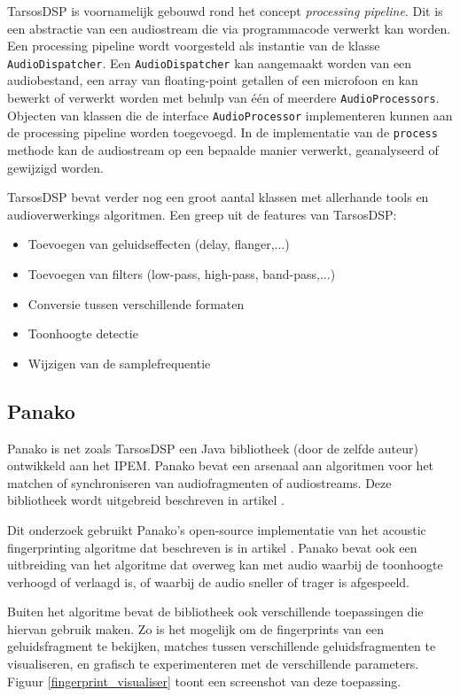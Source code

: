 TarsosDSP is voornamelijk gebouwd rond het concept \textit{processing pipeline}. Dit is een abstractie van een audiostream die via programmacode verwerkt kan worden. Een processing pipeline wordt voorgesteld als instantie van de klasse \texttt{AudioDispatcher}. Een \texttt{AudioDispatcher} kan aangemaakt worden van een audiobestand, een array van floating-point getallen of een microfoon en kan bewerkt of verwerkt worden met behulp van één of meerdere \texttt{AudioProcessors}. Objecten van klassen die de interface \texttt{AudioProcessor} implementeren kunnen aan de processing pipeline worden toegevoegd. In de implementatie van de \texttt{process} methode kan de audiostream op een bepaalde manier verwerkt, geanalyseerd of gewijzigd worden.

TarsosDSP bevat verder nog een groot aantal klassen met allerhande tools en audioverwerkings algoritmen. Een greep uit de features van TarsosDSP:
\begin{itemize}[noitemsep]
	\item Toevoegen van geluidseffecten (delay, flanger,...)
	\item Toevoegen van filters (low-pass, high-pass, band-pass,...)
	\item Conversie tussen verschillende formaten
	\item Toonhoogte detectie
	\item Wijzigen van de samplefrequentie
\end{itemize}

\subsection{Panako}

Panako is net zoals TarsosDSP een Java bibliotheek (door de zelfde auteur) ontwikkeld aan het IPEM. Panako bevat een arsenaal aan algoritmen voor het matchen of synchroniseren van audiofragmenten of audiostreams.  Deze bibliotheek wordt uitgebreid beschreven in artikel \cite{six2014panako}.

Dit onderzoek gebruikt Panako's open-source implementatie van het acoustic fingerprinting algoritme dat beschreven is in artikel \cite{Wang2003a}. Panako bevat ook een uitbreiding van het algoritme dat overweg kan met audio waarbij de toonhoogte verhoogd of verlaagd is, of waarbij de audio sneller of trager is afgespeeld.

Buiten het algoritme bevat de bibliotheek ook verschillende toepassingen die hiervan gebruik maken. Zo is het mogelijk om de fingerprints van een geluidsfragment te bekijken, matches tussen verschillende geluidsfragmenten te visualiseren, en grafisch te experimenteren met de verschillende parameters. Figuur \ref{fingerprint_visualiser} toont een screenshot van deze toepassing.

